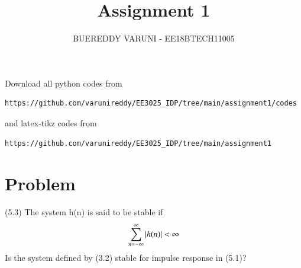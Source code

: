 \documentclass[journal,12pt,twocolumn]{IEEEtran}
\begin{document}
     \def\rightbox#1{\makebox[0in][r]{#1}}
     \def\centbox#1{\makebox[0in]{#1}}
     \def\topbox#1{\raisebox{-\baselineskip}[0in][0in]{#1}}
     \def\midbox#1{\raisebox{-0.5\baselineskip}[0in][0in]{#1}}
\vspace{3cm}
\title{Assignment 1}
\author{BUEREDDY VARUNI - EE18BTECH11005}
\maketitle
\newpage
\bigskip
\renewcommand{\thefigure}{\theenumi}
\renewcommand{\thetable}{\theenumi}
Download all python codes from 
\begin{lstlisting}
https://github.com/varunireddy/EE3025_IDP/tree/main/assignment1/codes
\end{lstlisting}
%
and latex-tikz codes from 
%
\begin{lstlisting}
https://github.com/varunireddy/EE3025_IDP/tree/main/assignment1
\end{lstlisting}
\section{Problem}
(5.3) The system h(n) is said to be stable if \\
\begin{align}
\sum_{n=-\infty}^{\infty} \left\vert h(n)\right\vert < \infty
\end{align}
Is the system defined by (3.2) stable for impulse response in (5.1)?
\end{document}
